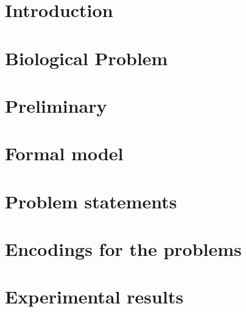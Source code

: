 \documentclass[smallcondensed]{svjour3}     %
\begin{document}
\date{Received: date / Accepted: date}

\maketitle


\begin{abstract}

\end{abstract}

\section{Introduction}
\label{sec:intro}


\section{Biological Problem}
\label{sec:bio}


\section{Preliminary}
\label{sec:prelim}


\section{Formal model}
\label{sec:model}


\section{Problem statements}
\label{sec:problem}


\section{Encodings for the problems}
\label{sec:encoding}


\section{Experimental results}
\label{sec:experiments}

\end{document}
